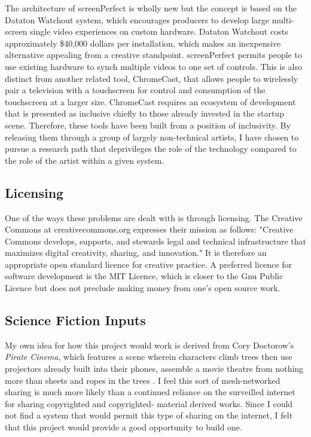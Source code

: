 The architecture of screenPerfect is wholly new but the concept is based on the Dataton Watchout system, which encourages producers to develop large multi-screen single video experiences on custom hardware. Dataton Watchout costs approximately \$40,000 dollars per installation, which makes an inexpensive alternative appealing from a creative standpoint. screenPerfect permits people to use existing hardware to synch multiple videos to one set of controls. This is also distinct from another related tool, ChromeCast, that allows people to wirelessly pair a television with a touchscreen for control and consumption of the touchscreen at a larger size. ChromeCast requires an ecosystem of development that is presented as inclusive chiefly to those already invested in the startup scene. Therefore, these tools have been built from a position of inclusivity. By releasing them through a group of largely non-technical artists, I have chosen to pursue a research path that deprivileges the role of the technology compared to the role of the artist within a given system.

\subsection{Licensing}
One of the ways these problems are dealt with is through licensing. The Creative Commons at creativecommons.org expresses their mission as follows: "Creative Commons develops, supports, and stewards legal and technical infrastructure that maximizes digital creativity, sharing, and innovation." It is therefore an appropriate open standard licence for creative practice. A preferred licence for software development is the MIT Licence, which is closer to the Gnu Public Licence but does not preclude making money from one's open source work. 

\subsection{Science Fiction Inputs}
My own idea for how this project would work is derived from Cory Doctorow's \textit{Pirate Cinema}, which features a scene wherein characters climb trees then use projectors already built into their phones, assemble a movie theatre from nothing more than sheets and ropes in the trees \parencite{doctorow}. I feel this sort of mesh-networked sharing is much more likely than a continued reliance on the surveilled internet for sharing copyrighted and copyrighted- material derived works. Since I could not find a system that would permit this type of sharing on the internet, I felt that this project would provide a good opportunity to build one.

